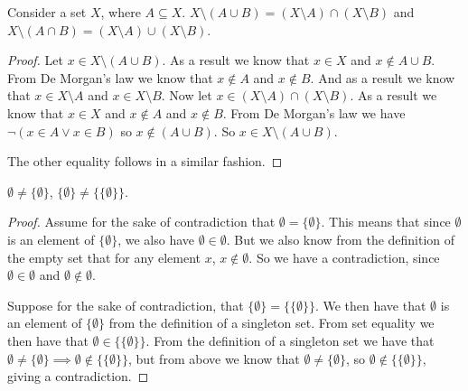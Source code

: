 \documentclass[12pt]{article}
\newenvironment{exercise}[2][Exercise]{\begin{trivlist}
\item[\hskip \labelsep {\bfseries #1}\hskip \labelsep {\bfseries #2}]}{\end{trivlist}}
\newenvironment{proposition}[2][Proposition]{\begin{trivlist}
\item[\hskip \labelsep {\bfseries #1}\hskip \labelsep {\bfseries #2}]}{\end{trivlist}}
\begin{document}
\begin{proposition}{3.1.28h}
	Consider a set $ X $, where $ A \subseteq X $.
	$ X \setminus (A \cup B) = (X \setminus A) \cap (X \setminus B) $ and $ X \setminus (A \cap B) = (X \setminus A) \cup (X \setminus B) $.
\end{proposition}
\begin{proof}
	Let $ x \in X \setminus (A \cup B) $.
	As a result we know that $ x \in X $ and $ x \notin A \cup B $.
	From De Morgan's law we know that $ x \notin A $ and $ x \notin B $.
	And as a result we know that $ x \in X \setminus A $ and $ x \in X \setminus B $.
	Now let $ x \in (X \setminus A) \cap (X \setminus B) $.
	As a result we know that $ x \in X $ and $ x \notin A $ and $ x \notin B $.
	From De Morgan's law we have $ \lnot (x \in A \lor x \in B) $ so $ x \notin (A \cup B) $.
	So $ x \in X \setminus (A \cup B) $.
	
	The other equality follows in a similar fashion.
\end{proof}

\begin{exercise}{3.1.2}
	$ \emptyset \neq \{ \emptyset \} $, $ \{ \emptyset \} \neq \{ \{ \emptyset \} \} $.
\end{exercise}
\begin{proof}
	Assume for the sake of contradiction that $ \emptyset = \{ \emptyset \} $.
	This means that since $ \emptyset $ is an element of $ \{ \emptyset \} $, we also have $ \emptyset \in \emptyset $.
	But we also know from the definition of the empty set that for any element $ x $, $ x \notin \emptyset $.
	So we have a contradiction, since $ \emptyset \in \emptyset $ and $ \emptyset \notin \emptyset $.
	
	Suppose for the sake of contradiction, that $ \{ \emptyset \} = \{ \{ \emptyset \} \} $.
	We then have that $ \emptyset $ is an element of $ \{ \emptyset \} $ from the definition of a singleton set.
	From set equality we then have that $ \emptyset \in \{ \{ \emptyset \} \} $.
	From the definition of a singleton set we have that $ \emptyset \neq \{ \emptyset \} \implies \emptyset \notin \{ \{ \emptyset \} \} $, but from above we know that $ \emptyset \neq \{ \emptyset \} $, so $ \emptyset \notin \{ \{ \emptyset \} \} $, giving a contradiction.
\end{proof}
\end{document}
